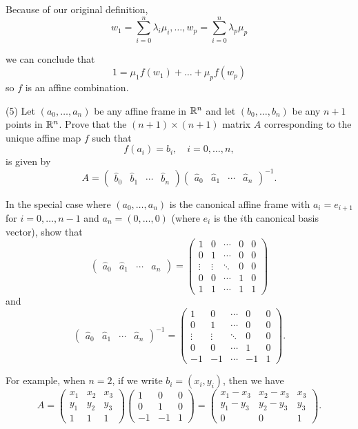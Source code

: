 \documentclass[12pt]{article}
\begin{document}
Because of our original definition, $$w_1 = \sum_{i=0}^{n} \lambda_i \mu_i, \ldots, w_p = \sum_{i=0}^{n} \lambda_p \mu_p$$

we can conclude that
$$1 = \mu_1 f(w_1) + \ldots + \mu_p f(w_p)$$
so $f$ is an affine combination.  
 
 

\medskip
(5)
Let $(a_0, \ldots, a_n)$ be any affine frame in $\mathbb{R}^n$ and
let $(b_0, \ldots, b_n)$ be any $n + 1$ points in $\mathbb{R}^n$. Prove that
the $(n + 1)\times (n + 1)$ matrix $A$ corresponding to
the unique affine map $f$
such that 
\[
f(a_i) = b_i, \quad i = 0, \ldots, n, 
\]
is given by
\[
A = 
\begin{pmatrix}
\widehat{b}_0 & \widehat{b}_1 & \cdots & \widehat{b}_n   
\end{pmatrix}
\begin{pmatrix}
\widehat{a}_0 & \widehat{a}_1 & \cdots & \widehat{a}_n   
\end{pmatrix}^{-1}.
\]

In the special case where  
$(a_0, \ldots, a_n)$ is the canonical  affine frame with 
$a_i = e_{i+1}$ for $i = 0, \ldots, n - 1$ and
$a_n = (0, \ldots, 0)$ 
(where $e_i$ is the $i$th canonical  basis vector), show that
\[
\begin{pmatrix}
\widehat{a}_0 & \widehat{a}_1 & \cdots & \widehat{a}_n   
\end{pmatrix}
= 
\begin{pmatrix}
1  & 0 & \cdots & 0 & 0 \\
0  & 1 & \cdots & 0 & 0\\
\vdots & \vdots & \ddots & 0 & 0 \\
0  &  0  & \cdots & 1 & 0 \\
1  &  1  & \cdots & 1 & 1
\end{pmatrix}
\] 
and
\[
\begin{pmatrix}
\widehat{a}_0 & \widehat{a}_1 & \cdots & \widehat{a}_n   
\end{pmatrix}^{-1}
= 
\begin{pmatrix}
1  & 0 & \cdots & 0 & 0\\
0  & 1 & \cdots & 0 & 0\\
\vdots & \vdots & \ddots & 0 & 0 \\
0  &  0  & \cdots & 1 & 0 \\
-1  &  -1  & \cdots & -1 & 1
\end{pmatrix} .
\]

For example, when $n = 2$, if we write $b_i = (x_i, y_i)$, then
we have
\[
A = 
\begin{pmatrix}
x_1 & x_2 & x_3 \\
y_1 & y_2&  y_3 \\
1  &   1 & 1
\end{pmatrix} 
\begin{pmatrix}
1 & 0 & 0 \\
0 & 1 & 0\\
-1 & -1 & 1
\end{pmatrix} 
= 
\begin{pmatrix}
x_1 - x_3 & x_2 -x_3 & x_3 \\
y_1 - y_3 & y_2 - y_3 &  y_3 \\
0  &   0 & 1
\end{pmatrix} .
\]
\end{document}
